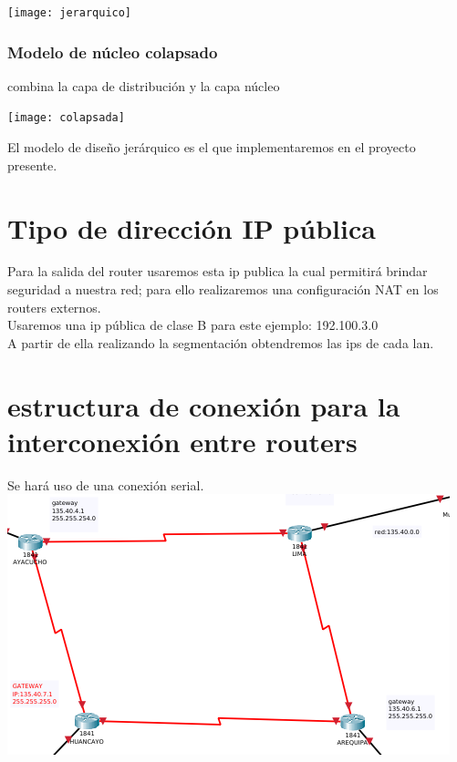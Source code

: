 \begin{center}
\texttt{[image: jerarquico]}
\end{center}

\subsubsection{ Modelo de n\'ucleo colapsado}
\begin{definicion}[]
{
 combina la capa de distribuci\'on y la capa n\'ucleo
 }
\end{definicion}
\texttt{[image: colapsada]}

El modelo de dise\~no jer\'arquico es el que implementaremos en el proyecto presente.

\section{Tipo de direcci\'on IP p\'ublica}

\begin{definicion}[]
{
 Para la salida del router usaremos esta ip publica la cual permitir\'a brindar seguridad a nuestra red; para ello realizaremos una configuraci\'on NAT en los routers externos.
 \\
 Usaremos una ip p\'ublica de clase B para este ejemplo: 192.100.3.0\\
A partir de ella realizando la segmentaci\'on obtendremos las ips de cada lan.
 }
\end{definicion}

\section{estructura de conexi\'on para la interconexi\'on entre routers}
Se har\'a uso de una conexi\'on serial.\\
\includegraphics[scale=0.5]{img/router.png} 

